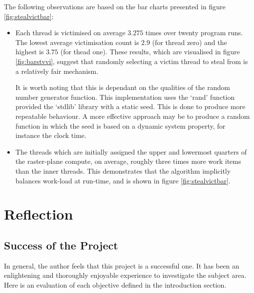 

The following observations are based on the bar charts presented in figure \ref{fig:stealvictbar}:

\begin{itemize}
\item 
    Each thread is victimised on average \(3.275\) times over twenty program runs. 
    The lowest average victimisation count is \(2.9\) (for thread zero) and the highest is \(3.75\) (for thead one).
    These results, which are visualised in figure \ref{fig:barstvvi}, suggest that randomly selecting a victim 
    thread to steal from is a relatively fair mechanism.

    It is worth noting that this is dependant on the qualities of the random number generator function.
    This implementation uses the `rand' function provided the `stdlib' library with a static seed. This is done to 
    produce more repeatable behaviour. 
    A more effective approach may be to produce a random function in which the seed is based on a dynamic system property,
    for instance the clock time. 

\item 
    The threads which are initially assigned the upper and lowermost quarters of the raster-plane compute, on average, roughly three times 
    more work items than the inner threads. 
    This demonstrates that the algorithm implicitly balances work-load at run-time, and is shown in 
    figure \ref{fig:stealvictbar}.
    
    
    
\end{itemize}

\section{Reflection}
\subsection{Success of the Project}

In general, the author feels that this project is a successful one. It has been an enlightening and thoroughly enjoyable experience
to investigate the subject area. Here is an evaluation of each objective defined in the introduction section.

